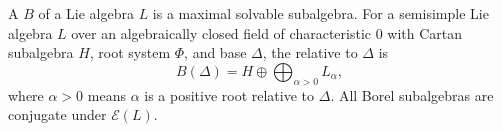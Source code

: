 A  $B$ of a Lie algebra $L$ is a maximal solvable subalgebra. For a semisimple Lie algebra $L$ over an algebraically closed field of characteristic 0 with Cartan subalgebra $H$, root system $\Phi$, and base $\Delta$, the  relative to $\Delta$ is
$$B(\Delta) = H \oplus \bigoplus_{\alpha > 0} L_\alpha,$$
where $\alpha > 0$ means $\alpha$ is a positive root relative to $\Delta$. All Borel subalgebras are conjugate under $\mathcal{E}(L)$.
